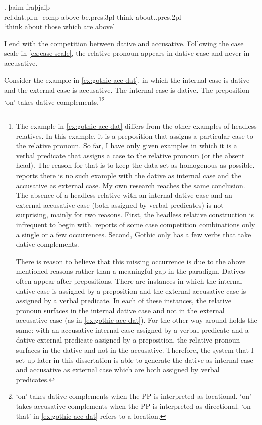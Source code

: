 \exg. þaim    fraþjaiþ \\
 \ac{rel}.\ac{dat}.\ac{pl}.\ac{n} -\ac{comp} above be.\ac{pres}.3\ac{pl}\scsub{[nom]} {think about}..\ac{pres}.2\ac{pl}\scsub{[dat]}\\
 `think about those which are above' \label{ex:gothic-nom-dat}

I end with the competition between dative and accusative. Following the case scale in \ref{ex:case-scale}, the relative pronoun appears in dative case and never in accusative.

Consider the example in \ref{ex:gothic-acc-dat}, in which the internal case is dative and the external case is accusative.
The internal case is dative. The preposition  `on' takes dative complements.\footnote{
The example in \ref{ex:gothic-acc-dat} differs from the other examples of headless relatives. In this example, it is a preposition that assigns a particular case to the relative pronoun. So far, I have only given examples in which it is a verbal predicate that assigns a case to the relative pronoun (or the absent head). The reason for that is to keep the data set as homogenous as possible. \citet{harbert1978} reports there is no such example with the dative as internal case and the accusative as external case. My own research reaches the same conclusion. The absence of a headless relative with an internal dative case and an external accusative case (both assigned by verbal predicates) is not surprising, mainly for two reasons. First, the headless relative construction is infrequent to begin with. \citeauthor{harbert1978} reports of some case competition combinations only a single or a few occurrences.
Second, Gothic only has a few verbs that take dative complements.

There is reason to believe that this missing occurrence is due to the above mentioned reasons rather than a meaningful gap in the paradigm. Datives often appear after prepositions. There are instances in which the internal dative case is assigned by a preposition and the external accusative case is assigned by a verbal predicate. In each of these instances, the relative pronoun surfaces in the internal dative case and not in the external accusative case (as in \ref{ex:gothic-acc-dat}). For the other way around holds the same: with an accusative internal case assigned by a verbal predicate and a dative external predicate assigned by a preposition, the relative pronoun surfaces in the dative and not in the accusative. Therefore, the system that I set up later in this dissertation is able to generate the dative as internal case and accusative as external case which are both assigned by verbal predicates.
}\footnote{
 `on' takes dative complements when the PP is interpreted as locational.  `on' takes accusative complements when the PP is interpreted as directional.  `on that' in \ref{ex:gothic-acc-dat} refers to a location.
}
